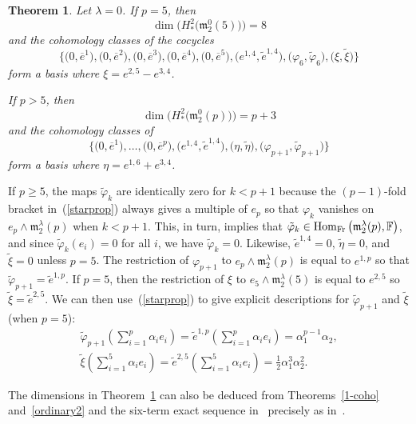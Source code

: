 \documentclass[pdftex]{sigma}
\def\Hom{\operatorname{Hom}}
\def\phi{\varphi}
\def\m{\mathfrak m}
\def\F{\mathbb F}
\numberwithin{equation}{section}
\newtheorem{Theorem}{Theorem}[section]
\begin{document}
\begin{Theorem}\label{zerolambda} Let $\lambda=0$.
 If $p=5$, then
 \[\dim\big(H_*^2\big(\m_2^0(5)\big)\big)=8\] and the
 cohomology classes of the cocycles
 \[\big\{\big(0,\overline e^1\big),\big(0,\overline e^2\big),\big(0,\overline e^3\big),
 \big(0,\overline e^4\big), \big(0,\overline e^5\big), \big(e^{1,4},\tilde e^{1,4}\big),
 \big(\phi_6, \tilde \phi_6\big), \big(\xi, \tilde \xi\big)\big\}\] form a basis where
 $\xi=e^{2,5}-e^{3,4}$.

 If $p>5$, then
 \[\dim\big(H^2_*\big(\m_2^0(p)\big)\big)=p+3\] and the cohomology
 classes of
 \[\big\{\big(0,\overline e^1\big),\dots, \big(0,\overline e^p\big),\big( e^{1,4},\tilde
 e^{1,4}\big),\big(\eta,\tilde \eta\big),\big(\phi_{p+1},\tilde \phi_{p+1}\big)\big\}\]
 form a basis where $\eta=e^{1,6}+e^{3,4}$.
\end{Theorem}

\begin{Remark}\label{mostarezero} If $p\ge 5$, the maps $\tilde\phi_k$ are
 identically zero for $k<p+1$ because the $(p-1)$-fold bracket in~(\ref{starprop}) always gives a multiple of $e_p$ so that $\phi_k$
 vanishes on $e_p\wedge \m_2^\lambda(p)$ when $k<p+1$. This, in turn,
 implies that $\tilde\phi_k\in\Hom_{\rm Fr}\big(\m_2^\lambda(p),\F\big)$, and
 since $\tilde\phi_k(e_i)=0$ for all $i$, we have
 $\tilde\phi_k=0$. Likewise, $\tilde e^{1,4}=0$, $\tilde\eta=0$, and
 $\tilde\xi=0$ unless $p=5$. The restriction of $\phi_{p+1}$ to
 $e_p\wedge \m_2^\lambda(p)$ is equal to $e^{1,p}$ so that
 $\tilde\phi_{p+1}=\tilde e^{1,p}$. If $p=5$, then the restriction of
 $\xi$ to $e_5\wedge \m_2^\lambda(5)$ is equal to $e^{2,5}$ so
 $\tilde\xi=\tilde e^{2,5}$. We can then use~(\ref{starprop}) to give
 explicit descriptions for $\tilde\phi_{p+1}$ and $\tilde\xi$ (when $p=5$):
 \begin{gather*}
 \tilde\phi_{p+1}\left (\sum_{i=1}^p \alpha_ie_i\right )=\tilde
 e^{1,p}\left (\sum_{i=1}^p \alpha_ie_i\right
 ) =\alpha_1^{p-1}\alpha_2,\nonumber\\
 \tilde\xi\left (\sum_{i=1}^5 \alpha_ie_i\right )=\tilde
 e^{2,5}\left (\sum_{i=1}^5 \alpha_ie_i\right
 ) =\frac{1}{2}\alpha_1^{3}\alpha_2^2.%
 \end{gather*}
\end{Remark}

\begin{Remark} The dimensions in Theorem~\ref{zerolambda} can also be deduced from Theorems~\ref{1-coho} and~\ref{ordinary2} and the six-term exact sequence in~\cite{Hochschild1954} precisely as in~\cite[Remark~4]{EvFi2019}.
\end{Remark}
\end{document}
